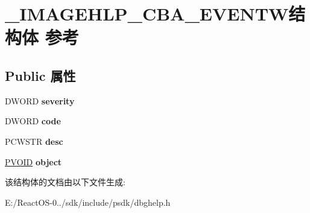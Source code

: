 \hypertarget{struct___i_m_a_g_e_h_l_p___c_b_a___e_v_e_n_t_w}{}\section{\+\_\+\+I\+M\+A\+G\+E\+H\+L\+P\+\_\+\+C\+B\+A\+\_\+\+E\+V\+E\+N\+T\+W结构体 参考}
\label{struct___i_m_a_g_e_h_l_p___c_b_a___e_v_e_n_t_w}
\subsection*{Public 属性}
\begin{DoxyCompactItemize}
\item 
\mbox{\label{struct___i_m_a_g_e_h_l_p___c_b_a___e_v_e_n_t_w_a30b2766132f36ed74772a385dd3efc69}} 
D\+W\+O\+RD {\bfseries severity}
\item 
\mbox{\label{struct___i_m_a_g_e_h_l_p___c_b_a___e_v_e_n_t_w_a92e7015bb49cc223c1fcd36e32489f6f}} 
D\+W\+O\+RD {\bfseries code}
\item 
\mbox{\label{struct___i_m_a_g_e_h_l_p___c_b_a___e_v_e_n_t_w_a8d555e17a33530504803ab0f77815083}} 
P\+C\+W\+S\+TR {\bfseries desc}
\item 
\mbox{\label{struct___i_m_a_g_e_h_l_p___c_b_a___e_v_e_n_t_w_a1888d80539e2a539763888994c0922b1}} 
\hyperlink{interfacevoid}{P\+V\+O\+ID} {\bfseries object}
\end{DoxyCompactItemize}


该结构体的文档由以下文件生成\+:\begin{DoxyCompactItemize}
\item 
E\+:/\+React\+O\+S-\/0../sdk/include/psdk/dbghelp.\+h\end{DoxyCompactItemize}
